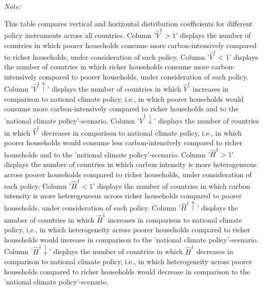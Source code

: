 \begingroup\fontsize{9}{11}\selectfont

\begin{ThreePartTable}
\begin{TableNotes}
\item \textit{Note: } 
\item This table compares vertical and horizontal distribution coefficients for different policy instruments across all countries. 
           Column '$\widehat{V}^{1} > 1$' displays the number of countries in which poorer households consume more carbon-intensively compared to richer households, under consideration of each policy.
           Column '$\widehat{V}^{1} < 1$' displays the number of countries in which richer households consume more carbon-intensively compared to poorer households, under consideration of each policy.
           Column '$\widehat{V}^{1} \uparrow$' displays the number of countries in which $\widehat{V}^{1}$ increases in comparison to national climate policy, i.e., in which poorer households would consume more carbon-intensively compared to richer households and to the 'national climate policy'-scenario.
           Column '$\widehat{V}^{1} \downarrow$' displays the number of countries in which $\widehat{V}^{1}$ decreases in comparison to national climate policy, i.e., in which poorer households would consume less carbon-intensively compared to richer households and to the 'national climate policy'-scenario.
           Column '$\widehat{H}^{1} > 1$' displays the number of countries in which carbon intensity is more heterogeneous across poorer households compared to richer households, under consideration of each policy.
           Column '$\widehat{H}^{1} < 1$' displays the number of countries in which carbon intensity is more heterogeneous across richer households compared to poorer households, under consideration of each policy.
           Column '$\widehat{H}^{1} \uparrow$' displays the number of countries in which $\widehat{H}^{1}$ increases in comparison to national climate policy, i.e., in which heterogeneity across poorer households compared to richer households would increase in comparison to the 'national climate policy'-scenario.
           Column '$\widehat{H}^{1} \downarrow$' displays the number of countries in which $\widehat{H}^{1}$ decreases in comparison to national climate policy, i.e., in which heterogeneity across poorer households compared to richer households would decrease in comparison to the 'national climate policy'-scenario.
\end{TableNotes}
\begin{longtable}[t]{l|cc|cc|cc|ccl|cc|cc|cc|ccl|cc|cc|cc|ccl|cc|cc|cc|ccl|cc|cc|cc|ccl|cc|cc|cc|ccl|cc|cc|cc|ccl|cc|cc|cc|ccl|cc|cc|cc|cc}

\end{longtable}
\end{ThreePartTable}
